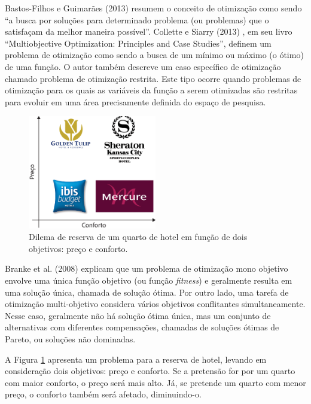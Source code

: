 Bastos-Filhos e Guimarães (2013) \cite{bastos2015multi} resumem o conceito de otimização como sendo “a busca por soluções para determinado problema (ou problemas) que o satisfaçam da melhor maneira possível”. Collette e Siarry (2013) \cite{collette2013multiobjective}, em seu livro “Multiobjective Optimization: Principles and Case Studies”, definem um problema de otimização como sendo a busca de um mínimo ou máximo (o ótimo) de uma função. O autor também descreve um caso específico de otimização chamado problema de otimização restrita. Este tipo ocorre quando problemas de otimização para os quais as variáveis da função a serem otimizadas são restritas para evoluir em uma área precisamente definida do espaço de pesquisa.

\begin{figure}[htb]
	\centering
	\caption{\label{fig:hotel-multi}Dilema de reserva de um quarto de hotel em função de dois objetivos: preço e conforto.} 
	\includegraphics[width=0.5\textwidth]{imagens/hotel-multi.eps}
\end{figure}

Branke et al. (2008) \cite{branke2008multiobjective} explicam que um problema de otimização mono objetivo envolve uma única função objetivo (ou função \textit{fitness}) e geralmente resulta em uma solução única, chamada de solução ótima. Por outro lado, uma tarefa de otimização multi-objetivo considera vários objetivos conflitantes simultaneamente. Nesse caso, geralmente não há solução ótima única, mas um conjunto de alternativas com diferentes compensações, chamadas de soluções ótimas de Pareto, ou soluções não dominadas.

A Figura \ref{fig:hotel-multi} apresenta um problema para a reserva de hotel, levando em consideração dois objetivos: preço e conforto. Se a pretensão for por um quarto com maior conforto, o preço será mais alto. Já, se pretende um quarto com menor preço, o conforto também será afetado, diminuindo-o.

